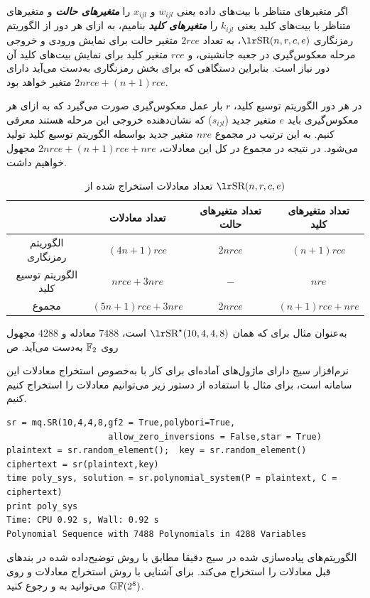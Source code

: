  اگر متغیرهای متناظر با بیت‌های داده یعنی 
$w_{ijl}$
و 
$x_{ijl}$
را 
\textbf{\textit{متغیرهای حالت}}
و متغیرهای متناظر با بیت‌های کلید یعنی 
$k_{ijl}$ 
را 
\textbf{\textit{متغیرهای کلید}}
بنامیم، به ازای هر دور از الگوریتم رمزنگاری 
$\text{\en{SR}}(n,r,c,e)$، 
به تعداد 
$2 r c e$
متغیر حالت برای نمایش ورودی و خروجی مرحله معکوس‌گیری در جعبه جانشینی، و 
$r c e$
متغیر کلید برای نمایش بیت‌های کلید آن دور نیاز  است. بنابراین دستگاهی که برای بخش رمزنگاری  به‌دست می‌آید دارای 
$2 n r c e + (n+1) r c e$
متغیر خواهد بود. 

در هر دور الگوریتم توسیع کلید، 
$r$
بار عمل معکوس‌گیری صورت می‌گیرد که به ازای هر معکوس‌گیری باید 
$e$
متغیر جدید 
($s_{ijl}$)
که نشان‌دهنده  خروجی این مرحله هستند معرفی کنیم. به این ترتیب در مجموع 
$nre$
متغیر جدید بواسطه الگوریتم توسیع کلید تولید می‌شود. در نتیجه در مجموع در کل این معادلات،  
$2nrce + (n+1)rce + nre$
مجهول خواهیم داشت. 
\begin{table}
\centering
\begin{tabular}{||c||c|c|c||}
	\hline
	& تعداد معادلات & تعداد متغیرهای حالت & تعداد متغیرهای کلید  \\ 
	\hline
	\hline
	الگوریتم رمزنگاری & $(4n+1)rce$ & $2nrce$ & $(n+1)rce$ \\ 
	\hline
	الگوریتم توسیع کلید & $nrce+3nre$ & $-$ & $nre$ \\
	\hline 
	مجموع & $(5n+1)rce+3nre$ & $2nrce$ & $(n+1)rce + nre$
\\
\hline
\end{tabular}
\caption{تعداد معادلات استخراج شده از 
	$\text{\en{SR}}(n,r,c,e)$}
\label{tab:number_of_eqs_in_SR}
\end{table} 
به‌عنوان مثال  برای 
که همان 
$\text{\en{SR}}^{\star}(10,4,4,8)$
است، 
$7488$
معادله  و 
$4288$
مجهول روی 
$\mathbb{F}_{2}$
به‌دست می‌آید. ص

نرم‌افزار سیج دارای ماژول‌های آماده‌ای برای کار با 
به‌خصوص استخراج معادلات این سامانه است، برای مثال با استفاده از دستور زیر می‌توانیم معادلات 
را استخراج کنیم کنیم. 
\begin{latin}
\begin{flushleft}
\begin{lstlisting}
sr = mq.SR(10,4,4,8,gf2 = True,polybori=True,
                    allow_zero_inversions = False,star = True)
plaintext = sr.random_element();  key = sr.random_element()
ciphertext = sr(plaintext,key)
time poly_sys, solution = sr.polynomial_system(P = plaintext, C = ciphertext)
print poly_sys
Time: CPU 0.92 s, Wall: 0.92 s
Polynomial Sequence with 7488 Polynomials in 4288 Variables
\end{lstlisting}
\end{flushleft}
\end{latin}
الگوریتم‌های پیاده‌سازی شده در سیج دقیقا مطابق با روش توضیح‌داده شده در بندهای قبل معادلات 
را استخراج می‌کند.  برای آشنایی با روش استخراج معادلات 
و 
روی 
$\mathbb{GF}(2^{8})$
می‌توانید به 
\cite{murphy2002essential}
و 
\cite{cid2006algebraic}
رجوع کنید. 
